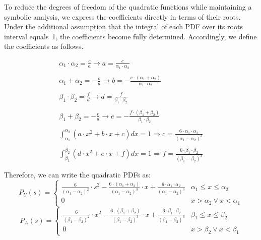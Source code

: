 \documentclass[sigconf]{acmart}
\theoremstyle{definition}
\begin{document}
To reduce the degrees of freedom of the quadratic functions while maintaining a symbolic analysis, we express the coefficients directly in terms of their roots. Under the additional assumption that the integral of each PDF over its roots interval equals~1, the coefficients become fully determined. Accordingly, we define the coefficients as follows.

\[
\begin{array}{ll}
    \alpha_1 \cdot \alpha_2 = \frac{c}{a} \rightarrow a = \frac{c}{\alpha_1 \cdot \alpha_2} \\
    \\
    \alpha_1 + \alpha_2 = -\frac{b}{a} \rightarrow b = - \frac{c \cdot (\alpha_1 + \alpha_2)}{\alpha_1 \cdot \alpha_2} \\
    \\
    \beta_1 \cdot \beta_2 = \frac{f}{d} \rightarrow d = \frac{f}{\beta_1 \cdot \beta_2}\\
    \\
    \beta_1 + \beta_2 = -\frac{e}{d} \rightarrow e = - \frac{f \cdot (\beta_1 + \beta_2)}{\beta_1 \cdot \beta_2} \\
    \\
    \int_{\alpha_1}^{\alpha_2} (a \cdot x^2+b \cdot x+c) dx = 1 \Rightarrow c = \frac{6 \cdot \alpha_1 \cdot \alpha_2}{(\alpha_1 - \alpha_2)^3} \\
    \\
    \int_{\beta_1}^{\beta_2} (d \cdot x^2+e \cdot x+f) dx = 1 \Rightarrow f = \frac{6 \cdot \beta_1 \cdot \beta_2}{(\beta_1 - \beta_2)^3} \\
    \\
    \end{array}
\]
Therefore, we can write the quadratic PDFs as:
\[
P_U(s) =
\left\{
\begin{array}{ll}
     \frac{6}{(\alpha_1 - \alpha_2)^2} \cdot s^2 - \frac{6 \cdot (\alpha_1 + \alpha_2)}{(\alpha_1 - \alpha_2)^3} \cdot x + \frac{6 \cdot \alpha_1 \cdot \alpha_2}{(\alpha_1 - \alpha_2)^3} & \alpha_1 \leq x \leq \alpha_2 \\
    0 & x > \alpha_2 \lor x < \alpha_1
    \end{array}
\right.
\]
\[
P_A(s) =
\left\{
\begin{array}{ll}
     \frac{6}{(\beta_1 - \beta_2)^2} \cdot x^2 - \frac{6 \cdot (\beta_1 + \beta_2)}{(\beta_1 - \beta_2)^3} \cdot x + \frac{6 \cdot \beta_1 \cdot \beta_2}{(\beta_1 - \beta_2)^3} & \beta_1 \leq x \leq \beta_2 \\
    0 & x > \beta_2 \lor x < \beta_1
    \end{array}
\right.
\]
\end{document}
